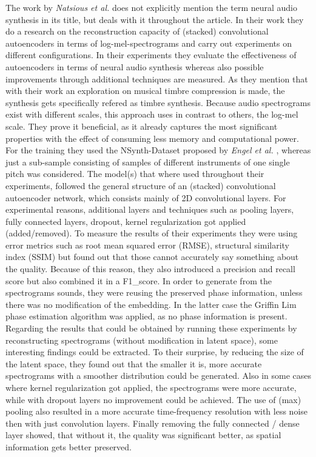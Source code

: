 The work by \textit{Natsious et al.} does not explicitly mention the term neural audio synthesis in its title, but deals with it throughout the article. \cite{Natsiou2023} In their work they do a research on the reconstruction capacity of (stacked) convolutional autoencoders in terms of log-mel-spectrograms and carry out experiments on different configurations. In their experiments they evaluate the effectiveness of autoencoders in terms of neural audio synthesis whereas also possible improvements through additional techniques are measured. As they mention that with their work an exploration on musical timbre compression is made, the synthesis gets specifically refered as timbre synthesis. Because audio spectrograms exist with different scales, this approach uses in contrast to others, the log-mel scale. They prove it beneficial, as it already captures the most significant properties with the effect of consuming less memory and computational power. For the training they used the NSynth-Dataset proposed by \textit{Engel et al. } \cite{Engel2017}, whereas just a sub-sample consisting of samples of different instruments of one single pitch was considered. The model(s) that where used throughout their experiments, followed the general structure of an (stacked) convolutional autoencoder network, which consists mainly of 2D convolutional layers. For experimental reasons, additional layers and techniques such as pooling layers, fully connected layers, dropout, kernel regularization got applied (added/removed). To measure the results of their experiments they were using error metrics such as root mean squared error (RMSE), structural similarity index (SSIM) but found out that those cannot accurately say something about the quality. Because of this reason, they also introduced a precision and recall score but also combined it in a F1\_score. In order to generate from the spectrograms sounds, they were reusing the preserved phase information, unless there was no modification of the embedding. In the latter case the Griffin Lim phase estimation algorithm was applied, as no phase information is present.\\
Regarding the results that could be obtained by running these experiments by reconstructing spectrograms (without modification in latent space), some interesting findings could be extracted. To their surprise, by reducing the size of the latent space, they found out that the smaller it is, more accurate spectrograms with a smoother distribution could be generated. Also in some cases where kernel regularization got applied, the spectrograms were more accurate, while with dropout layers no improvement could be achieved. The use of (max) pooling also resulted in a more accurate time-frequency resolution with less noise then with just convolution layers. Finally removing the fully connected / dense layer showed, that without it, the quality was significant better, as spatial information gets better preserved.\\

